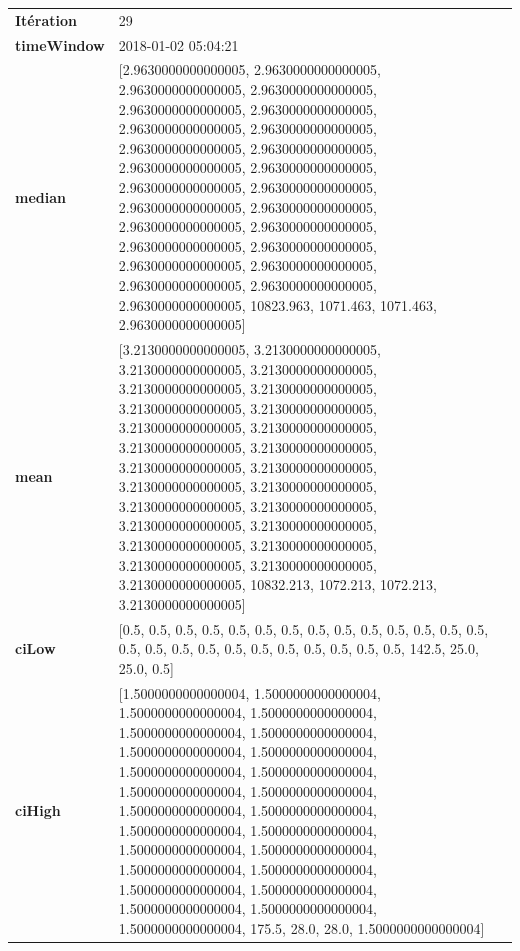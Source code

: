 \begin{table}[H]
	\centering
	\begin{tabularx}{\textwidth}{lX}
		\textbf{Itération}& 29 \\
		\textbf{timeWindow} &2018-01-02 05:04:21 \\
		
		\textbf{median} &[2.9630000000000005, 2.9630000000000005, 2.9630000000000005, 2.9630000000000005, 2.9630000000000005, 2.9630000000000005, 2.9630000000000005, 2.9630000000000005, 2.9630000000000005, 2.9630000000000005, 2.9630000000000005, 2.9630000000000005, 2.9630000000000005, 2.9630000000000005, 2.9630000000000005, 2.9630000000000005, 2.9630000000000005, 2.9630000000000005, 2.9630000000000005, 2.9630000000000005, 2.9630000000000005, 2.9630000000000005, 2.9630000000000005, 2.9630000000000005, 2.9630000000000005, 10823.963, 1071.463, 1071.463, 2.9630000000000005] \\
		\textbf{mean} & [3.2130000000000005, 3.2130000000000005, 3.2130000000000005, 3.2130000000000005, 3.2130000000000005, 3.2130000000000005, 3.2130000000000005, 3.2130000000000005, 3.2130000000000005, 3.2130000000000005, 3.2130000000000005, 3.2130000000000005, 3.2130000000000005, 3.2130000000000005, 3.2130000000000005, 3.2130000000000005, 3.2130000000000005, 3.2130000000000005, 3.2130000000000005, 3.2130000000000005, 3.2130000000000005, 3.2130000000000005, 3.2130000000000005, 3.2130000000000005, 3.2130000000000005, 10832.213, 1072.213, 1072.213, 3.2130000000000005] \\
		\textbf{ciLow}& [0.5, 0.5, 0.5, 0.5, 0.5, 0.5, 0.5, 0.5, 0.5, 0.5, 0.5, 0.5, 0.5, 0.5, 0.5, 0.5, 0.5, 0.5, 0.5, 0.5, 0.5, 0.5, 0.5, 0.5, 0.5, 142.5, 25.0, 25.0, 0.5] \\
		\textbf{ciHigh}& [1.5000000000000004, 1.5000000000000004, 1.5000000000000004, 1.5000000000000004, 1.5000000000000004, 1.5000000000000004, 1.5000000000000004, 1.5000000000000004, 1.5000000000000004, 1.5000000000000004, 1.5000000000000004, 1.5000000000000004, 1.5000000000000004, 1.5000000000000004, 1.5000000000000004, 1.5000000000000004, 1.5000000000000004, 1.5000000000000004, 1.5000000000000004, 1.5000000000000004, 1.5000000000000004, 1.5000000000000004, 1.5000000000000004, 1.5000000000000004, 1.5000000000000004, 175.5, 28.0, 28.0, 1.5000000000000004] \\
							\end{tabularx} 
						\end{table}
						
